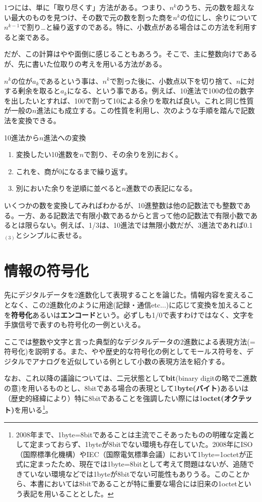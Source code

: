 1つには、単に「取り尽くす」方法がある。つまり、$n^k$のうち、元の数を超えない最大のものを見つけ、その数で元の数を割った商を$n^k$の位にし、余りについて$n^{k-1}$で割り…と繰り返すのである。特に、小数点がある場合はこの方法を利用すると楽である。

だが、この計算はやや面倒に感じることもあろう。そこで、主に整数向けであるが、先に書いた位取りの考えを用いる方法がある。

$n^k$の位が$a_k$であるという事は、$n^k$で割った後に、小数点以下を切り捨て、$n$に対する剰余を取ると$a_k$になる、という事である。例えば、10進法で100の位の数字を出したいとすれば、100で割って10による余りを取れば良い。これと同じ性質が一般の$n$進法にも成立する。この性質を利用し、次のような手順を踏んで記数法を変換できる。
\begin{itembox}[l]{10進法から$n$進法への変換}
\begin{enumerate}
\item 変換したい10進数を$n$で割り、その余りを別におく。
\item これを、商が0になるまで繰り返す。
\item 別においた余りを逆順に並べると$n$進数での表記になる。
\end{enumerate}
\end{itembox}

いくつかの数を変換してみればわかるが、10進整数は他の記数法でも整数である。一方、ある記数法で有限小数であるからと言って他の記数法で有限小数であるとは限らない。例えば、1/3は、10進法では無限小数だが、3進法であれば0.1$_{(3)}$とシンプルに表せる。

\section{情報の符号化}
先にデジタルデータを2進数化して表現することを論じた。情報内容を変えることなく、この2進数化のように用途(記録・通信etc...)に応じて変換を加えることを\textbf{符号化}あるいは\textbf{エンコード}という。必ずしも1/0で表すわけではなく、文字を手旗信号で表すのも符号化の一例といえる。

ここでは整数や文字と言った典型的なデジタルデータの2進数による表現方法(=符号化)を説明する。また、やや歴史的な符号化の例としてモールス符号を、デジタルでアナログを近似している例として小数の表現方法を紹介する。

なお、これ以降の議論については、二元状態として\textbf{bit}(binary digitの略で二進数の意)を用いるものとし、8bitである場合の表現として1\textbf{byte(バイト)}あるいは（歴史的経緯により）特に8bitであることを強調したい際には1\textbf{octet(オクテット)}を用いる\footnote{2008年まで、1byte=8bitであることは主流でこそあったものの明確な定義として定まっておらず、1byteが8bitでない環境も存在していた。2008年にISO（国際標準化機構）やIEC（国際電気標準会議）において1byte=1octetが正式に定まったため、現在では1byte=8bitとして考えて問題はないが、追随できていない環境などでは1byteが8bitでない可能性もありうる。このことから、本書においては8bitであることが特に重要な場合には旧来の1octetという表記を用いることとした。}。

